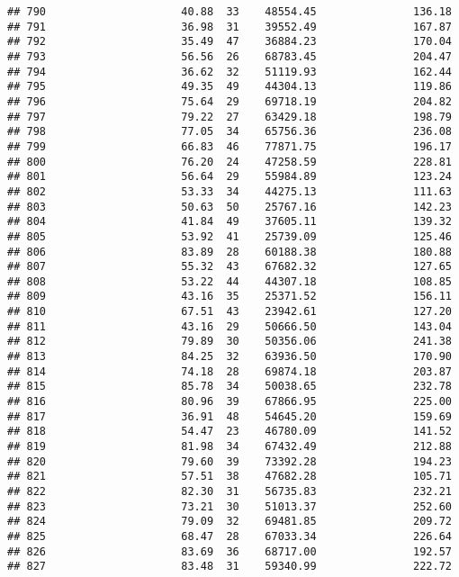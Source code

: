 \documentclass[
]{article}
\begin{document}
\begin{verbatim}
## 790                     40.88  33    48554.45               136.18
## 791                     36.98  31    39552.49               167.87
## 792                     35.49  47    36884.23               170.04
## 793                     56.56  26    68783.45               204.47
## 794                     36.62  32    51119.93               162.44
## 795                     49.35  49    44304.13               119.86
## 796                     75.64  29    69718.19               204.82
## 797                     79.22  27    63429.18               198.79
## 798                     77.05  34    65756.36               236.08
## 799                     66.83  46    77871.75               196.17
## 800                     76.20  24    47258.59               228.81
## 801                     56.64  29    55984.89               123.24
## 802                     53.33  34    44275.13               111.63
## 803                     50.63  50    25767.16               142.23
## 804                     41.84  49    37605.11               139.32
## 805                     53.92  41    25739.09               125.46
## 806                     83.89  28    60188.38               180.88
## 807                     55.32  43    67682.32               127.65
## 808                     53.22  44    44307.18               108.85
## 809                     43.16  35    25371.52               156.11
## 810                     67.51  43    23942.61               127.20
## 811                     43.16  29    50666.50               143.04
## 812                     79.89  30    50356.06               241.38
## 813                     84.25  32    63936.50               170.90
## 814                     74.18  28    69874.18               203.87
## 815                     85.78  34    50038.65               232.78
## 816                     80.96  39    67866.95               225.00
## 817                     36.91  48    54645.20               159.69
## 818                     54.47  23    46780.09               141.52
## 819                     81.98  34    67432.49               212.88
## 820                     79.60  39    73392.28               194.23
## 821                     57.51  38    47682.28               105.71
## 822                     82.30  31    56735.83               232.21
## 823                     73.21  30    51013.37               252.60
## 824                     79.09  32    69481.85               209.72
## 825                     68.47  28    67033.34               226.64
## 826                     83.69  36    68717.00               192.57
## 827                     83.48  31    59340.99               222.72

\end{verbatim}
\end{document}

